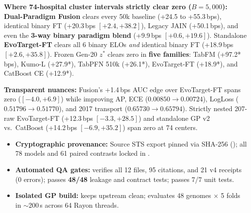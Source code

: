 \documentclass[8.5pt,letterpaper]{article}
\begin{document}
\noindent
\begin{minipage}[t]{0.486\textwidth}
  \vspace{0pt}
  {\fontsize{7.6}{9.45}\selectfont
  \textbf{Where 74-hospital cluster intervals strictly clear zero ($B{=}5{,}000$):} \textbf{Dual-Paradigm Fusion} clears every 50k baseline (+24.5 to +55.3\,bps), identical binary FT (+20.3\,bps $[+2.4, +38.2]$), Legacy JAIN (+50.1\,bps), and even the \textbf{3-way binary paradigm blend} (+9.9\,bps $[+0.6, +19.6]$). Standalone \textbf{EvoTarget-FT} clears all 6 binary ELOs \emph{and} identical binary FT (+18.9\,bps $[+2.6, +35.8]$). Frozen Gen-20 $z^*$ clears zero in \textbf{five families}: TabFM (+97.2*\,bps), Kumo-L (+27.9*), TabPFN 5\x{}10k (+26.1*), EvoTarget-FT (+18.9*), and CatBoost CE (+12.9*).

  \vspace{2.0pt}
  \textbf{Transparent nuances:} Fusion's +1.4\,bps AUC edge over EvoTarget-FT spans zero ($[-4.0, +6.9]$) while improving AP, ECE ($0.00850 \to 0.00724$), LogLoss ($0.51796 \to 0.51770$), and 2017 transport ($0.65730 \to 0.65794$). Strictly nested 207-raw EvoTarget-FT (+12.3\,bps $[-3.3, +28.5]$) and standalone GP v2 vs.\ CatBoost (+14.2\,bps $[-6.9, +35.2]$) span zero at 74 centers.
  }

  \vspace{2.8pt}
  {\fontsize{7.55}{9.4}\selectfont\raggedright
  \begin{itemize}[leftmargin=1.12em,itemsep=1.4pt,topsep=1.0pt]
    \item \textbf{Cryptographic provenance:} Source STS export pinned via SHA-256 (); all 78 models and 61 paired contrasts locked in .
    \item \textbf{Automated QA gates:}  verifies all 12  files, 95 citations, and 21 v4 receipts (0 errors);  passes \textbf{48/48} leakage and contract tests;  passes 7/7 unit tests.
    \item \textbf{Isolated GP build:}  keeps upstream  clean;  evaluates 48 genomes $\times$ 5 folds in $\sim$200\,s across 64 Rayon threads.
  \end{itemize}
  }
\end{minipage}\hfill
\end{document}
